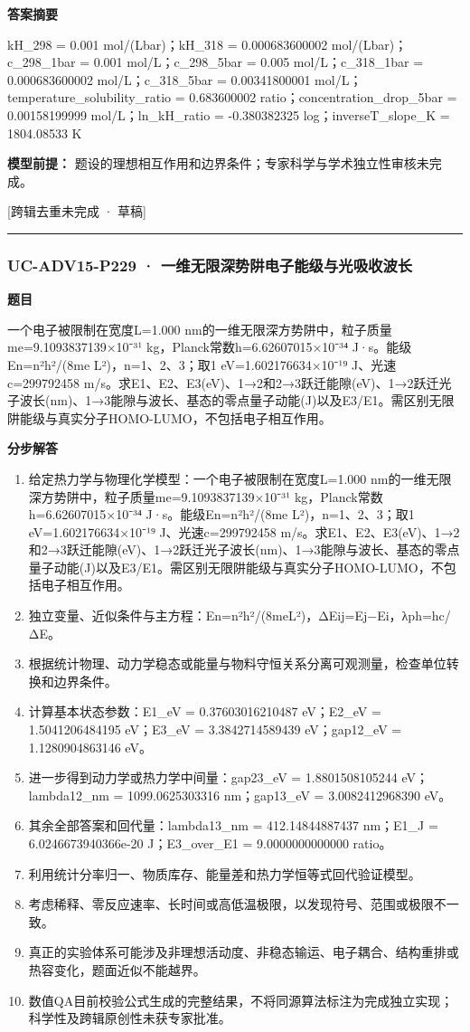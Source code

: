 \documentclass[UTF8,11pt,a4paper]{ctexart}
\begin{document}
\noindent\textbf{答案摘要}\par
kH\_298 = 0.001 mol/(Lbar)；kH\_318 = 0.000683600002 mol/(Lbar)；c\_298\_1bar = 0.001 mol/L；c\_298\_5bar = 0.005 mol/L；c\_318\_1bar = 0.000683600002 mol/L；c\_318\_5bar = 0.00341800001 mol/L；temperature\_solubility\_ratio = 0.683600002 ratio；concentration\_drop\_5bar = 0.00158199999 mol/L；ln\_kH\_ratio = -0.380382325 log；inverseT\_slope\_K = 1804.08533 K\par
\noindent\textbf{模型前提：}
题设的理想相互作用和边界条件；专家科学与学术独立性审核未完成。\par
\noindent\textcolor{red!65!black}{[跨辑去重未完成 · 草稿]} \par
\medskip\hrule\medskip
{}
\subsubsection*{UC-ADV15-P229 · 一维无限深势阱电子能级与光吸收波长}
\noindent\textbf{题目}\par
一个电子被限制在宽度L=1.000 nm的一维无限深方势阱中，粒子质量me=9.1093837139×10⁻³¹ kg，Planck常数h=6.62607015×10⁻³⁴ J·s。能级En=n²h²/(8me L²)，n=1、2、3；取1 eV=1.602176634×10⁻¹⁹ J、光速c=299792458 m/s。求E1、E2、E3(eV)、1→2和2→3跃迁能隙(eV)、1→2跃迁光子波长(nm)、1→3能隙与波长、基态的零点量子动能(J)以及E3/E1。需区别无限阱能级与真实分子HOMO-LUMO，不包括电子相互作用。\par
\medskip\noindent\textbf{分步解答}
\begin{enumerate}
\item 给定热力学与物理化学模型：一个电子被限制在宽度L=1.000 nm的一维无限深方势阱中，粒子质量me=9.1093837139×10⁻³¹ kg，Planck常数h=6.62607015×10⁻³⁴ J·s。能级En=n²h²/(8me L²)，n=1、2、3；取1 eV=1.602176634×10⁻¹⁹ J、光速c=299792458 m/s。求E1、E2、E3(eV)、1→2和2→3跃迁能隙(eV)、1→2跃迁光子波长(nm)、1→3能隙与波长、基态的零点量子动能(J)以及E3/E1。需区别无限阱能级与真实分子HOMO-LUMO，不包括电子相互作用。
\item 独立变量、近似条件与主方程：En=n²h²/(8meL²)，ΔEij=Ej−Ei，λph=hc/ΔE。
\item 根据统计物理、动力学稳态或能量与物料守恒关系分离可观测量，检查单位转换和边界条件。
\item 计算基本状态参数：E1\_eV = 0.37603016210487 eV；E2\_eV = 1.5041206484195 eV；E3\_eV = 3.3842714589439 eV；gap12\_eV = 1.1280904863146 eV。
\item 进一步得到动力学或热力学中间量：gap23\_eV = 1.8801508105244 eV；lambda12\_nm = 1099.0625303316 nm；gap13\_eV = 3.0082412968390 eV。
\item 其余全部答案和回代量：lambda13\_nm = 412.14844887437 nm；E1\_J = 6.0246673940366e-20 J；E3\_over\_E1 = 9.0000000000000 ratio。
\item 利用统计分率归一、物质库存、能量差和热力学恒等式回代验证模型。
\item 考虑稀释、零反应速率、长时间或高低温极限，以发现符号、范围或极限不一致。
\item 真正的实验体系可能涉及非理想活动度、非稳态输运、电子耦合、结构重排或热容变化，题面近似不能越界。
\item 数值QA目前校验公式生成的完整结果，不将同源算法标注为完成独立实现；科学性及跨辑原创性未获专家批准。
\end{enumerate}
\end{document}
